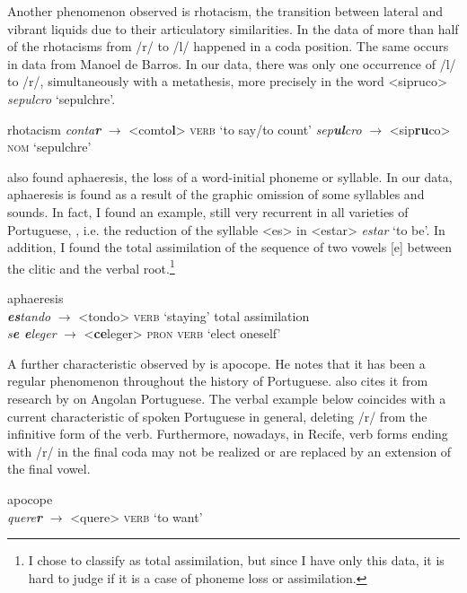 \documentclass[output=paper,colorlinks,citecolor=brown]{langscibook}
\begin{document}
Another phenomenon observed is rhotacism, the transition between lateral and vibrant liquids due to their articulatory similarities. In the data of \citet[418]{Oliveira_2006} more than half of the rhotacisms from /r/ to /l/ happened in a coda position. The same occurs in data from Manoel de Barros. In our data, there was only one occurrence of /l/ to /r/, simultaneously with a metathesis, more precisely in the word <sipruco> \emph{sepulcro} ‘sepulchre’.

\ea\label{ex:6:6} rhotacism
    \ea \emph{conta\textbf{r}} $\rightarrow$ <comto\textbf{l}> \textsc{verb} ‘to say/to count’
    \ex \emph{sep\textbf{ul}cro} $\rightarrow$ <sip\textbf{ru}co> \textsc{nom} ‘sepulchre’
\z
\z

\citet[326]{Oliveira_2006} also found aphaeresis, the loss of a word-initial phoneme or syllable. In our data, aphaeresis is found as a result of the graphic omission of some syllables and sounds. In fact, I found an example, still very recurrent in all varieties of Portuguese, , i.e. the reduction of the syllable <es> in <estar> \emph{estar} ‘to be’. In addition, I found the total assimilation of the sequence of two vowels [e] between the clitic and the verbal root.\footnote{I chose to classify  as total assimilation, but since I have only this data, it is hard to judge if it is a case of phoneme loss or assimilation.}

\ea\label{ex:6:8}
    aphaeresis\\
    \emph{\textbf{es}tando} $\rightarrow$ <tondo> \textsc{verb} ‘staying’
\ex\label{ex:6:9}
    total assimilation\\
    \emph{s\textbf{e e}leger} $\rightarrow$ <\textbf{ce}leger> \textsc{pron} \textsc{verb} ‘elect oneself’
\z

A further characteristic observed by \citet[336]{Oliveira_2006} is apocope. He notes that it has been a regular phenomenon throughout the history of Portuguese. \citet[163]{Petter_2009} also cites it from research by \citet{Chavagne_2005} on Angolan Portuguese. The verbal example  below coincides with a current characteristic of spoken Portuguese in general, deleting /r/ from the infinitive form of the verb. Furthermore, nowadays, in Recife, verb forms ending with /r/ in the final coda may not be realized or are replaced by an extension of the final vowel.

\ea\label{ex:6:10}
    apocope\\\emph{quere\textbf{r}} $\rightarrow$ <quere> \textsc{verb} ‘to want’
\z
         
\end{document}
